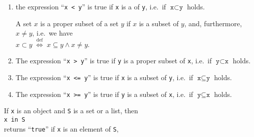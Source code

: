 \begin{enumerate}
\item the expression ``\texttt{x < y}'' is true if \texttt{x} is a  of \texttt{y}, 
      i.e.~if $\texttt{x} \subset \texttt{y}$ holds.

      A set $x$ is a proper subset of a set $y$ if $x$ is a subset of $y$, and, furthermore, $x \not= y$,
      i.e.~we have
      \\[0.2cm]
      \hspace*{1.3cm}
      $x \subset y \;\stackrel{\mathrm{def}}{\Longleftrightarrow}\; x \subseteq y \wedge x \not= y$. 
\item The expression ``\texttt{x > y}'' is true if \texttt{y} is a proper subset of \texttt{x},
      i.e.~if $\texttt{y} \subset \texttt{x}$ holds.
\item The expression ``\texttt{x <= y}'' is true if \texttt{x} is a subset of \texttt{y},
      i.e.~if $\texttt{x} \subseteq \texttt{y}$ holds.
\item The expression ``\texttt{x >= y}'' is true if \texttt{y} is a subset of \texttt{x},
      i.e.~if $\texttt{y} \subseteq \texttt{x}$ holds.
\end{enumerate}
If \texttt{x} is an object and \texttt{S} is a set or a list, then
\\[0.2cm]
\hspace*{1.3cm}
\texttt{x in S}
\\[0.2cm]
returns ``\texttt{true}'' if \texttt{x} is an element of \texttt{S},


